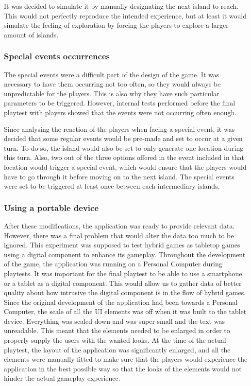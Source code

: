 It was decided to simulate it by manually designating the next island to reach. This would not perfectly reproduce the intended experience, but at least it would simulate the feeling of exploration by forcing the players to explore a larger amount of islands.

\subsubsection{Special events occurrences}
The special events were a difficult part of the design of the game. It was necessary to have them occurring not too often, so they would always be unpredictable for the players. This is also why they have such particular parameters to be triggered. However, internal tests performed before the final playtest with players showed that the events were not occurring often enough. 

Since analysing the reaction of the players when facing a special event, it was decided that some regular events would be pre-made and set to occur at a given turn. To do so, the island would also be set to only generate one location during this turn. Also, two out of the three options offered in the event included in that location would trigger a special event, which would ensure that the players would have to go through it before moving on to the next island. The special events were set to be triggered at least once between each intermediary islands.

\subsubsection{Using a portable device}
After these modifications, the application was ready to provide relevant data. However, there was a final problem that would alter the data too much to be ignored. This experiment was supposed to test hybrid games as tabletop games using a digital component to enhance its gameplay. Throughout the development of the game, the application was running on a Personal Computer during playtests. It was important for the final playtest to be able to use a smartphone or a tablet as a digital component. This would allow us to gather data of better quality about how intrusive the digital component is in the flow of hybrid games.  
Since the original development of the application had been towards a Personal Computer, the scale of all the UI elements was off when it was built to the tablet device. Everything was scaled down and was super small and the text was unreadable. This meant that the elements needed to be enlarged in order to properly supply the users with the wanted looks. At the time of the actual playtest, the layout of the application was significantly enlarged, and all the elements were manually fitted to make sure that the players would experience the application in the best possible way so that the looks of the elements would not hinder the actual gameplay experience.

